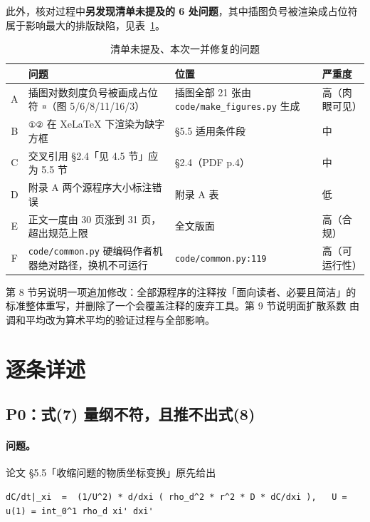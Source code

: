 \documentclass[11pt,a4paper]{ctexart}
\newcommand{\src}[1]{\texttt{#1}}
\begin{document}
此外，核对过程中\textbf{另发现清单未提及的 6 处问题}，其中插图负号被渲染成占位符
属于影响最大的排版缺陷，见表~\ref{tab:extra}。

\begin{table}[htbp]
\centering
\small
\caption{清单未提及、本次一并修复的问题}
\label{tab:extra}
\begin{tabular}{@{}c>{\raggedright\arraybackslash}p{}>{\raggedright\arraybackslash}p{}>{\raggedright\arraybackslash}p{}@{}}
\toprule
 & \textbf{问题} & \textbf{位置} & \textbf{严重度} \\
\midrule
A & 插图对数刻度负号被画成占位符 \texttt{¤}（图 5/6/8/11/16/3） & 插图全部 21 张由 \src{code/make\_figures.py} 生成 & 高（肉眼可见） \\
B & \texttt{①②} 在 XeLaTeX 下渲染为缺字方框 & §5.5 适用条件段 & 中 \\
C & 交叉引用 §2.4「见 4.5 节」应为 5.5 节 & §2.4（PDF p.4） & 中 \\
D & 附录 A 两个源程序大小标注错误 & 附录 A 表 & 低 \\
E & 正文一度由 30 页涨到 31 页，超出规范上限 & 全文版面 & 高（合规） \\
F & \src{code/common.py} 硬编码作者机器绝对路径，换机不可运行 & \src{code/common.py:119} & 高（可运行性） \\
\bottomrule
\end{tabular}
\end{table}

\noindent 第 8 节另说明一项追加修改：全部源程序的注释按「面向读者、必要且简洁」的
标准整体重写，并删除了一个会覆盖注释的废弃工具。第 9 节说明面扩散系数
由调和平均改为算术平均的验证过程与全部影响。

\section{逐条详述}

\subsection{P0：式(7) 量纲不符，且推不出式(8)}

\paragraph{问题。}论文 §5.5「收缩问题的物质坐标变换」原先给出

\begin{lstlisting}[style=old]
dC/dt|_xi  =  (1/U^2) * d/dxi ( rho_d^2 * r^2 * D * dC/dxi ),   U = u(1) = int_0^1 rho_d xi' dxi'
\end{lstlisting}
\end{document}
